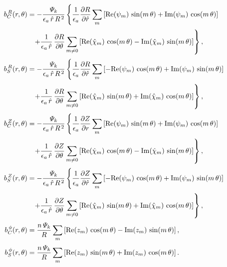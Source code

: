 \documentclass[12pt,prb,aps,notitlepage]{revtex4-1}
\begin{document}
\begin{align}
b_C^{\,R}(r,\theta) &= -\frac{{\mit\Psi}_k}{\epsilon_a\,\hat{r}\,R^{\,2}}\left\{\frac{1}{\epsilon_a}\frac{\partial R}{\partial \hat{r}}\sum_m\left[{\rm Re}(\psi_m)\,\sin(m\,\theta) + {\rm Im}(\psi_m)\,\cos(m\,\theta)\right]\right.\\[0.5ex]
&\phantom{=} \left.+ \frac{1}{\epsilon_a\,\hat{r}}\,\frac{\partial R}{\partial\theta}\sum_{m\neq 0}\left[{\rm Re}(\hat{\chi}_m)\,\cos(m\,\theta) - {\rm Im}(\hat{\chi}_m)\,\sin(m\,\theta)\right]\right\},\\[0.5ex]
b_S^{\,R}(r,\theta) &= -\frac{{\mit\Psi}_k}{\epsilon_a\,\hat{r}\,R^{\,2}}\left\{\frac{1}{\epsilon_a}\frac{\partial R}{\partial \hat{r}}\sum_m\left[-{\rm Re}(\psi_m)\,\cos(m\,\theta) + {\rm Im}(\psi_m)\,\sin(m\,\theta)\right]\right.\\[0.5ex]
&\phantom{=} \left.+ \frac{1}{\epsilon_a\,\hat{r}}\,\frac{\partial R}{\partial\theta}\sum_{m\neq 0}\left[{\rm Re}(\hat{\chi}_m)\,\sin(m\,\theta) + {\rm Im}(\hat{\chi}_m)\,\cos(m\,\theta)\right]\right\},\\[0.5ex]
b_C^{\,Z}(r,\theta) &= -\frac{{\mit\Psi}_k}{\epsilon_a\,\hat{r}\,R^{\,2}}\left\{\frac{1}{\epsilon_a}\frac{\partial Z}{\partial r}\sum_m\left[{\rm Re}(\psi_m)\,\sin(m\,\theta) + {\rm Im}(\psi_m)\,\cos(m\,\theta)\right]\right.\\[0.5ex]
&\phantom{=} \left.+ \frac{1}{\epsilon_a\,\hat{r}}\,\frac{\partial Z}{\partial\theta}\sum_{m\neq 0}\left[{\rm Re}(\hat{\chi}_m)\,\cos(m\,\theta) - {\rm Im}(\hat{\chi}_m)\,\sin(m\,\theta)\right]\right\},\\[0.5ex]
b_S^{\,Z}(r,\theta) &= -\frac{{\mit\Psi}_k}{\epsilon_a\,\hat{r}\,R^{\,2}}\left\{\frac{1}{\epsilon_a}\frac{\partial Z}{\partial \hat{r}}\sum_m\left[-{\rm Re}(\psi_m)\,\cos(m\,\theta) + {\rm Im}(\psi_m)\,\sin(m\,\theta)\right]\right.\\[0.5ex]
&\phantom{=} \left.+ \frac{1}{\epsilon_a\,\hat{r}}\,\frac{\partial Z}{\partial\theta}\sum_{m\neq 0}\left[{\rm Re}(\hat{\chi}_m)\,\sin(m\,\theta) +{\rm Im}(\hat{\chi}_m)\,\cos(m\,\theta)\right]\right\},\\[0.5ex]
b_C^{\,\phi}(r,\theta) & =\frac{n\,{\mit\Psi}_k}{R}\sum_{m}\left[{\rm Re}(z_m)\,\cos(m\,\theta) - {\rm Im}(z_m)\,\sin(m\,\theta)\right],\\[0.5ex]
b_S^{\,\phi}(r,\theta) &= \frac{n\,{\mit\Psi}_k}{R}\sum_{m}\left[{\rm Re}(z_m)\,\sin(m\,\theta) + {\rm Im}(z_m)\,\cos(m\,\theta)\right].
\end{align}
\end{document}
